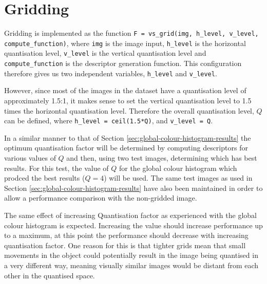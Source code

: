 \FloatBarrier
\section{Gridding} \label{sec:gridding-results}
Gridding is implemented as the function \texttt{F = vs\_grid(img, h\_level, v\_level, compute\_function)}, where \texttt{img} is the image input, \texttt{h\_level} is the horizontal quantisation level, \texttt{v\_level} is the vertical quantisation level and \texttt{compute\_function} is the descriptor generation function. This configuration therefore gives us two independent variables, \texttt{h\_level} and \texttt{v\_level}.

However, since most of the images in the dataset have a quantisation level of approximately 1.5:1, it makes sense to set the vertical quantisation level to 1.5 times the horizontal quantisation level. Therefore the overall quantisation level, $Q$ can be defined, where \texttt{h\_level = ceil(1.5*Q)}, and \texttt{v\_level = Q}.

In a similar manner to that of Section \ref{sec:global-colour-histogram-results} the optimum quantisation factor will be determined by computing descriptors for various values of $Q$ and then, using two test images, determining which has best results. For this test, the value of $Q$ for the global colour histogram which prodced the best results ($Q=4$) will be used. The same test images as used in Section \ref{sec:global-colour-histogram-results} have also been maintained in order to allow a performance comparison with the non-gridded image.

The same effect of increasing Quantisation factor as experienced with the global colour histogram is expected. Increasing the value should increase performance up to a maximum, at this point the performance should decrease with increasing quantisation factor. One reason for this is that tighter grids mean that small movements in the object could potentially result in the image being quantised in a very different way, meaning visually similar images would be distant from each other in the quantised space.


